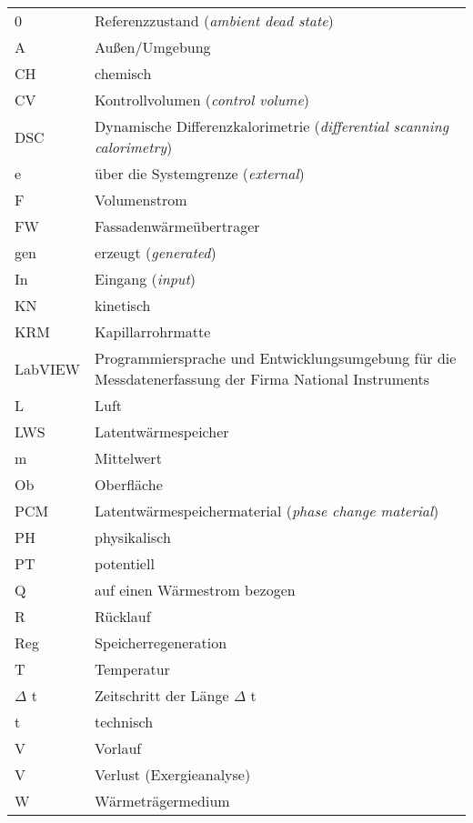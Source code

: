 \begin{onehalfspacing}
\begin{longtable}[h]{p{} p{}}
		0 & Referenzzustand (\emph{ambient dead state})\\
		A & Außen/Umgebung\\ 		
		CH & chemisch\\
		CV & Kontrollvolumen (\emph{control volume})\\
		DSC & Dynamische Differenzkalorimetrie (\emph{differential scanning calorimetry}) \\
		e & über die Systemgrenze (\emph{external})\\
		F & Volumenstrom\\	
		FW & Fassadenwärmeübertrager\\
		gen & erzeugt (\emph{generated})\\
		In & Eingang (\emph{input})\\
		KN & kinetisch\\
		KRM & Kapillarrohrmatte\\
		LabVIEW & Programmiersprache und Entwicklungsumgebung für die Messdatenerfassung der Firma National Instruments\\
		L & Luft\\
		LWS & Latentwärmespeicher\\	
		m & Mittelwert\\
			Ob&Oberfläche\\
		PCM & Latentwärmespeichermaterial (\emph{phase change material})\\
		PH & physikalisch\\
		PT & potentiell\\
		Q & auf einen Wärmestrom bezogen\\
		R & Rücklauf\\
		Reg& Speicherregeneration\\
		T & Temperatur\\
		$\Delta$ t & Zeitschritt der Länge $\Delta$ t\\
		t & technisch\\
		V & Vorlauf\\
		V & Verlust (Exergieanalyse)\\
		W&Wärmeträgermedium\\
		
\end{longtable}
\end{onehalfspacing}

